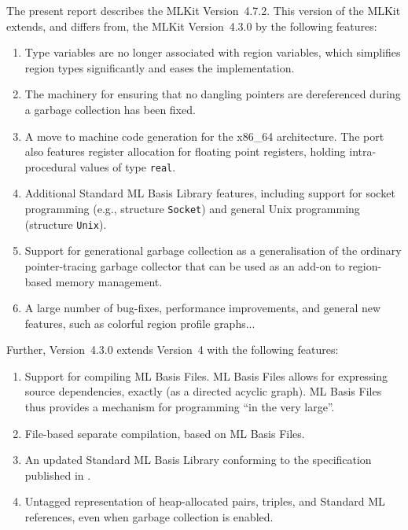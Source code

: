 \documentclass[12pt]{book}
\newcommand{\docversion}{4.7.2}
\begin{document}
The present report describes the
\index{MLKit!Version \docversion}%
MLKit Version~{\docversion}. This version of the MLKit extends, and differs from, the MLKit
Version~4.3.0 by the following features:

\begin{enumerate}
\item Type variables are no longer associated with region variables,
  which simplifies region types significantly and eases the
  implementation.
\item The machinery for ensuring that no dangling pointers are
  dereferenced during a garbage collection has been fixed.
\item A move to machine code generation for the x86\_64
  architecture. The port also features register allocation for
  floating point registers, holding intra-procedural values of type \texttt{real}.

\item Additional Standard ML Basis Library features, including support
  for socket programming (e.g., structure \texttt{Socket}) and general
  Unix programming (structure \texttt{Unix}).

\item Support for generational garbage collection as a generalisation
  of the ordinary pointer-tracing garbage collector that can be used
  as an add-on to region-based memory management.

\item A large number of bug-fixes, performance improvements, and
  general new features, such as colorful region profile graphs...
\end{enumerate}

Further, Version~4.3.0 extends Version~4 with the following features:
\begin{enumerate}
\item Support for compiling
%
ML Basis Files. ML Basis Files allows for
  expressing source dependencies, exactly (as a directed acyclic
  graph). ML Basis Files thus provides a mechanism for programming
  ``in the very large''.

\item File-based
%
separate compilation, based on ML Basis Files.
\item An updated Standard ML Basis Library conforming to the
  specification published in \cite{basislib2004}.
\item Untagged representation of heap-allocated pairs, triples, and
  Standard ML references, even when garbage collection is enabled.
\end{enumerate}
\end{document}
